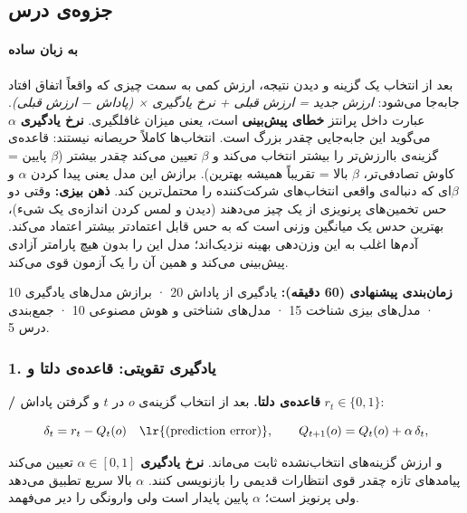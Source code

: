
\subsection{جزوه‌ی درس}

\paragraph{به زبان ساده}

بعد از انتخاب یک گزینه و دیدن نتیجه، ارزش کمی به سمت چیزی که واقعاً اتفاق
افتاد جابه‌جا می‌شود: \emph{ارزش جدید = ارزش قبلی + نرخ یادگیری × (پاداش \ensuremath{-}
ارزش قبلی)}. عبارت داخل پرانتز \textbf{خطای پیش‌بینی} است، یعنی میزان
غافلگیری. \textbf{نرخ یادگیری} \(\alpha\) می‌گوید این جابه‌جایی چقدر بزرگ
است. انتخاب‌ها کاملاً حریصانه نیستند: قاعده‌ی \textbf{} گزینه‌ی
باارزش‌تر را بیشتر انتخاب می‌کند و \textbf{}
\(\beta\) تعیین می‌کند چقدر بیشتر (\(\beta\) پایین = کاوش تصادفی‌تر،
\(\beta\) بالا = تقریباً همیشه بهترین). برازش این مدل یعنی پیدا کردن
\(\alpha\) و \(\beta\)ای که دنباله‌ی واقعی انتخاب‌های شرکت‌کننده را
محتمل‌ترین کند. \textbf{ذهن بیزی:} وقتی دو حس تخمین‌های پرنویزی از یک چیز
می‌دهند (دیدن و لمس کردن اندازه‌ی یک شیء)، بهترین حدس یک میانگین وزنی است
که به حس قابل اعتمادتر بیشتر اعتماد می‌کند. آدم‌ها اغلب به این وزن‌دهی
بهینه نزدیک‌اند؛ مدل این را بدون هیچ پارامتر آزادی پیش‌بینی می‌کند و همین
آن را یک آزمون قوی می‌کند.

\textbf{زمان‌بندی پیشنهادی (60 دقیقه):} یادگیری از پاداش 20 · برازش
مدل‌های یادگیری 10 · مدل‌های بیزی شناخت 15 · مدل‌های شناختی و هوش مصنوعی 10
· جمع‌بندی درس 5.

\subsubsection{\texorpdfstring{1. یادگیری تقویتی: قاعده‌ی دلتا و
}{1. یادگیری تقویتی: قاعده‌ی دلتا و Q-learning}}

\textbf{ / قاعده‌ی دلتا.} بعد از انتخاب گزینه‌ی \(o\)
در  \(t\) و گرفتن پاداش \(r_t \in \{0, 1\}\):

\[
\delta_t = r_t - Q_t(o) \quad\text{\lr{(prediction error)}}, \qquad
Q_{t+1}(o) = Q_t(o) + \alpha\,\delta_t,
\]

و ارزش گزینه‌های انتخاب‌نشده ثابت می‌ماند. \textbf{نرخ یادگیری}
\(\alpha \in [0, 1]\) تعیین می‌کند پیامدهای تازه چقدر قوی انتظارات قدیمی
را بازنویسی کنند. \(\alpha\) بالا سریع تطبیق می‌دهد ولی پرنویز است؛
\(\alpha\) پایین پایدار است ولی وارونگی را دیر می‌فهمد.

